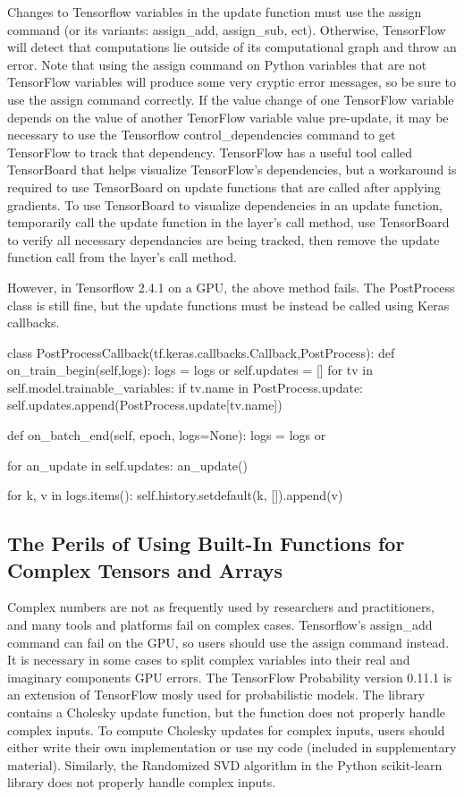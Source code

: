 Changes to Tensorflow variables in the update function must use the assign command (or its variants: assign\_add, assign\_sub, ect). Otherwise, TensorFlow will detect that computations lie outside of its computational graph and throw an error. Note that using the assign command on Python variables that are not TensorFlow variables will produce some very cryptic error messages, so be sure to use the assign command correctly. If the value change of one TensorFlow variable depends on the value of another TenorFlow variable value pre-update, it may be necessary to use the Tensorflow control\_dependencies command to get TensorFlow to track that dependency. TensorFlow has a useful tool called TensorBoard that helps visualize TensorFlow's dependencies, but a workaround is required to use TensorBoard on update functions that are called after applying gradients. To use TensorBoard to visualize dependencies in an update function, temporarily call the update function in the layer's call method, use TensorBoard to verify all necessary dependancies are being tracked, then remove the update function call from the layer's call method.

However, in Tensorflow 2.4.1 on a GPU, the above method fails. The PostProcess class is still fine, but the update functions must be instead be called using Keras callbacks.
\begin{code}
class PostProcessCallback(tf.keras.callbacks.Callback,PostProcess):
    def on_train_begin(self,logs):
        logs = logs or {}
        self.updates = []
        for tv in self.model.trainable_variables:
            if tv.name in PostProcess.update:
                self.updates.append(PostProcess.update[tv.name])

    def on_batch_end(self, epoch, logs=None):
        logs = logs or {}

        for an_update in self.updates:
            an_update()

        for k, v in logs.items():
            self.history.setdefault(k, []).append(v)
\end{code}

\subsection{The Perils of Using Built-In Functions for Complex Tensors and Arrays}
Complex numbers are not as frequently used by researchers and practitioners, and many tools and platforms fail on complex cases.  Tensorflow's assign\_add command can fail on the GPU, so users should use the assign command instead. It is necessary in some cases to split complex variables into their real and imaginary components GPU errors. 
The TensorFlow Probability version 0.11.1 \cite{tensorflowprobability} is an extension of TensorFlow mosly used for probabilistic models. The library contains a Cholesky update function, but the function does not properly handle complex inputs. To compute Cholesky updates for complex inputs, users should either write their own implementation or use my code (included in supplementary material). Similarly, the Randomized SVD algorithm in the Python scikit-learn library does not properly handle complex inputs.

